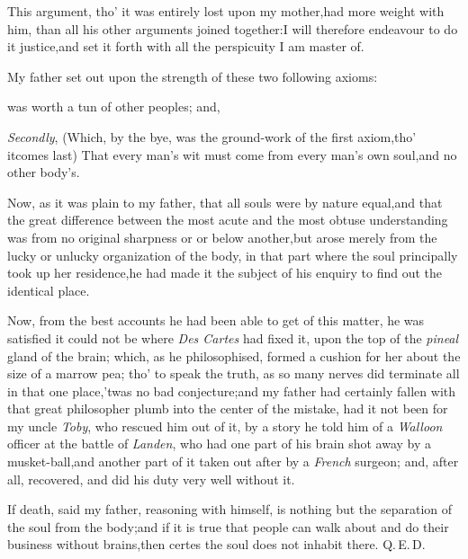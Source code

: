 \documentclass{article}
\begin{document}
This argument, tho’ it was entirely lost upon my
mother,\tsk had more weight with him, than all his other
arguments joined together:\tsk I will therefore endeavour to do
it justice,\tsk and set it forth with all the perspicuity I am
master of.

My father set out upon the strength of these two following
axioms:

\noindent
{}
was worth a tun of other peoples; and,

\textit{Secondly}, (Which, by the bye, was the ground-work of the
first axiom,\tsk tho’ it\break comes last) That every
man’s wit must come from every man’s own
soul,\tsk and no other body’s.

Now, as it was plain to my father, that all souls were by nature
equal,\tsk and that the great difference between the most
acute and the most obtuse understanding
\tsk was from no
original sharpness or\break
{}\break or
below another,\tsk but arose merely from the lucky or
unlucky organization of the body, in that part where the soul
principally took up her residence,\tsh he had made it the
subject of his enquiry to find out the identical place.

Now, from the best accounts he had been able to get of this
matter, he was satisfied it could not be where \textit{Des
Cartes} had fixed it, upon the top of the \textit{pineal}
gland of the brain; which, as he philo\-sophised, formed a cushion
for her about the size of a marrow pea; tho’ to speak the
truth, as so many nerves did terminate all in that one
place,\tsk ’twas no bad conjecture;\tsk and my
father had certainly fallen with that great philosopher plumb into
the center of the mistake, had it not been for my uncle
\textit{Toby}, who rescued him out of it, by a story he told him of a
\textit{Walloon} officer at the battle of \textit{Landen}, who had one
part of his brain shot away by a musket-ball,\tsk and another
part of it taken out after by a \textit{French} surgeon; and, after
all, recovered, and did his duty very well without it.

If death, said my father, reasoning with himself, is nothing but
the separation of the soul from the body;\tsk and if it is true
that people can walk about and do their business without
brains,\tsk then certes the soul does not inhabit there.
\quad Q.\,E.\,D.
\end{document}
